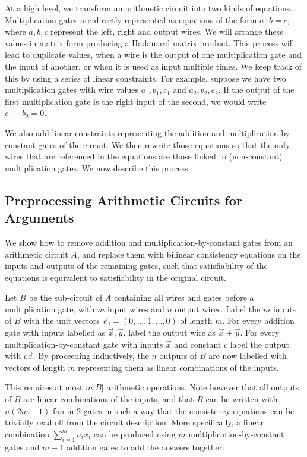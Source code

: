 At a high level, we transform an arithmetic circuit into two kinds of equations. 
Multiplication gates are directly represented as equations of the form $a\cdot b=c$, where $a,b,c$ represent the left, right and output wires. We will arrange these values in matrix form producing a Hadamard matrix product. This process will lead to duplicate values, when a wire is the output of one multiplication gate and the input of another, or when it is used as input multiple times. We keep track of this by using a series of linear constraints. For example, suppose we have two multiplication gates with wire values $a_1,b_1,c_1$ and $a_2,b_2,c_2$. If the output of the first multiplication gate is the right input of the second, we would write $c_1 - b_2 = 0$.

We also add linear constraints representing the addition and multiplication by constant gates of the circuit. We then rewrite those equations so that the only wires that are referenced in the equations are those linked to (non-constant) multiplication gates. %
We now describe this process.

\subsection{Preprocessing Arithmetic Circuits for Arguments}\label{sec:preprocAC}

We show how to remove addition and multiplication-by-constant gates  from an arithmetic circuit $A$, and replace them with bilinear consistency equations on the inputs and outputs of the remaining gates, such that satisfiability of the equations is equivalent to satisfiability in the original circuit.

 Let $B$ be the sub-circuit of $A$ containing all wires and gates before a multiplication gate, with $m$ input wires and $n$ output wires. Label the $m$ inputs of $B$ with the unit vectors $\vec{e}_i=(0,\ldots,1,\ldots,0)$ of length $m$. For every addition gate with inputs labelled as $\vec{x},\vec{y}$, label the output wire as $\vec{x}+\vec{y}$. For every multiplication-by-constant gate with inputs $\vec{x}$ and constant $c$ label the output with $c\vec{x}$. By proceeding inductively, the $n$ outputs of $B$ are now labelled with vectors of length $m$ representing them as linear combinations of the inputs.

This requires at most $m\left| B \right|$ arithmetic operations. Note however that all outputs of $B$ are linear combinations of the inputs, and that $B$ can be written with $n(2m-1)$ fan-in 2 gates in such a way that the consistency equations can be trivially read off from the circuit description. More specifically, a linear combination $\sum_{i=1}^m a_i x_i$ can be produced using $m$ multiplication-by-constant gates and $m-1$ addition gates to add the answers together.

